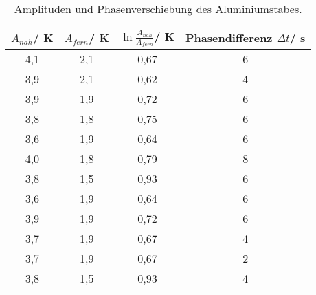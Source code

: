 \begin{table}[H]
  \centering
   \begin{tabular}{c c c c}
    \toprule
     $A_{nah}$/ K & $A_{fern}$/ K & $\ln{\frac{A_{nah}}{A_{fern}}}$/ K & Phasendifferenz $\Delta t$/ s\\
    \midrule
    4,1 & 2,1 & 0,67 & 6\\
    3,9 & 2,1 & 0,62 & 4\\
    3,9 & 1,9 & 0,72 & 6\\
    3,8 & 1,8 & 0,75 & 6\\
    3,6 & 1,9 & 0,64 & 6\\
    4,0 & 1,8 & 0,79 & 8\\
    3,8 & 1,5 & 0,93 & 6\\
    3,6 & 1,9 & 0,64 & 6\\
    3,9 & 1,9 & 0,72 & 6\\
    3,7 & 1,9 & 0,67 & 4\\
    3,7 & 1,9 & 0,67 & 2\\
    3,8 & 1,5 & 0,93 & 4\\
    \bottomrule
  \end{tabular}
  \caption{Amplituden und Phasenverschiebung des Aluminiumstabes.}
  \label{tab:tab3}
\end{table}
